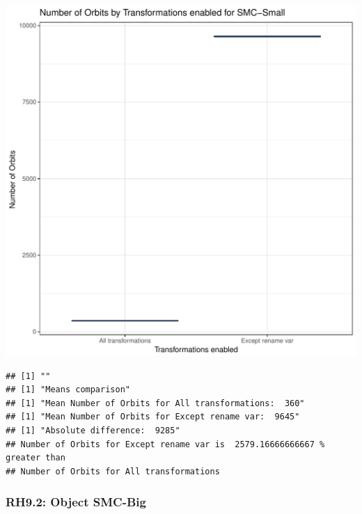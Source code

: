 \documentclass{article}\usepackage[]{graphicx}\usepackage[]{color}
\makeatletter
\def\maxwidth{ %
  \ifdim\Gin@nat@width>\linewidth
    \linewidth
  \else
    \Gin@nat@width
  \fi
}
\newenvironment{kframe}{%
 \def\at@end@of@kframe{}%
 \ifinner\ifhmode%
  \def\at@end@of@kframe{\end{minipage}}%
  \begin{minipage}{\columnwidth}%
 \fi\fi%
 \def\FrameCommand##1{\hskip\@totalleftmargin \hskip-\fboxsep
 \colorbox{shadecolor}{##1}\hskip-\fboxsep
     \hskip-\linewidth \hskip-\@totalleftmargin \hskip\columnwidth}%
 \MakeFramed {\advance\hsize-\width
   \@totalleftmargin\z@ \linewidth\hsize
   \@setminipage}}%
 {\par\unskip\endMakeFramed%
 \at@end@of@kframe}
\newenvironment{knitrout}{}{} %
\makeatother
\begin{document}
\begin{knitrout}
\color{fgcolor}
\includegraphics[width=\maxwidth]{figure/RH9_small-1} 
\begin{kframe}

{\ttfamily\noindent\bfseries\color{errorcolor}{\#\# Error in eval(expr, envir, enclos): object 'shap\_cashew\_small' not found}}\begin{verbatim}
## [1] ""
## [1] "Means comparison"
## [1] "Mean Number of Orbits for All transformations:  360"
## [1] "Mean Number of Orbits for Except rename var:  9645"
## [1] "Absolute difference:  9285"
## Number of Orbits for Except rename var is  2579.16666666667 % greater than 
## Number of Orbits for All transformations
\end{verbatim}
\end{kframe}
\end{knitrout}


\subsubsection{RH9.2: Object SMC-Big}
\end{document}
